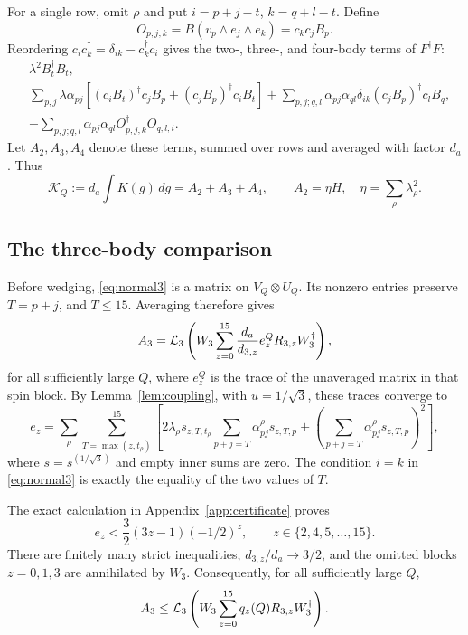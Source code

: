 For a single row, omit $\rho$ and put $i=p+j-t$, $k=q+l-t$. Define
\[
 O_{p,j,k}=B(v_p\wedge e_j\wedge e_k)=c_kc_jB_p.
\]
Reordering $c_ic_k^\dagger=\delta_{ik}-c_k^\dagger c_i$ gives the two-, three-, and four-body terms of $F^\dagger F$:
\begin{align}
 &\lambda^2 B_t^\dagger B_t,\label{eq:normal2}\\
 &\sum_{p,j}\lambda\alpha_{pj}\left[(c_iB_t)^\dagger c_jB_p
                         +(c_jB_p)^\dagger c_iB_t\right]
   +\sum_{p,j;q,l}\alpha_{pj}\alpha_{ql}\delta_{ik}
                         (c_jB_p)^\dagger c_lB_q,\label{eq:normal3}\\
 &-\sum_{p,j;q,l}\alpha_{pj}\alpha_{ql}
                         O_{p,j,k}^\dagger O_{q,l,i}.\label{eq:normal4}
\end{align}
Let $A_2,A_3,A_4$ denote these terms, summed over rows and averaged with factor $d_a$. Thus
\begin{equation}\label{eq:Adecomp}
 \mathcal K_Q:=d_a\int K(g)\,dg=A_2+A_3+A_4,\qquad A_2=\eta H,
 \quad \eta=\sum_\rho\lambda_\rho^2.
\end{equation}

\subsection{The three-body comparison}
Before wedging, \eqref{eq:normal3} is a matrix on $V_Q\otimes U_Q$. Its nonzero entries preserve $T=p+j$, and $T\le15$. Averaging therefore gives
\begin{equation}\label{eq:A3}
 A_3=\mathcal L_3\left(W_3\sum_{z=0}^{15}\frac{d_a}{d_{3,z}}e_z^Q R_{3,z}W_3^\dagger\right),
\end{equation}
for all sufficiently large $Q$, where $e_z^Q$ is the trace of the unaveraged matrix in that spin block. By Lemma~\ref{lem:coupling}, with $u=1/\sqrt3$, these traces converge to
\begin{equation}\label{eq:ez}
 e_z=\sum_\rho\sum_{T=\max(z,t_\rho)}^{15}
 \left[2\lambda_\rho s_{z,T,t_\rho}
                   \sum_{p+j=T}\alpha^{\rho}_{pj}s_{z,T,p}
       +\left(\sum_{p+j=T}\alpha^{\rho}_{pj}s_{z,T,p}\right)^2\right],
\end{equation}
where $s=s^{(1/\sqrt3)}$ and empty inner sums are zero. The condition $i=k$ in \eqref{eq:normal3} is exactly the equality of the two values of $T$.

The exact calculation in Appendix~\ref{app:certificate} proves
\begin{equation}\label{eq:3certificate}
 e_z<\frac32(3z-1)(-1/2)^z,
 \qquad z\in\{2,4,5,\ldots,15\}.
\end{equation}
There are finitely many strict inequalities, $d_{3,z}/d_a\to3/2$, and the omitted blocks $z=0,1,3$ are annihilated by $W_3$. Consequently, for all sufficiently large $Q$,
\begin{equation}\label{eq:A3bound}
 A_3\le\mathcal L_3\left(W_3\sum_{z=0}^{15}q_z(Q)R_{3,z}W_3^\dagger\right).
\end{equation}

